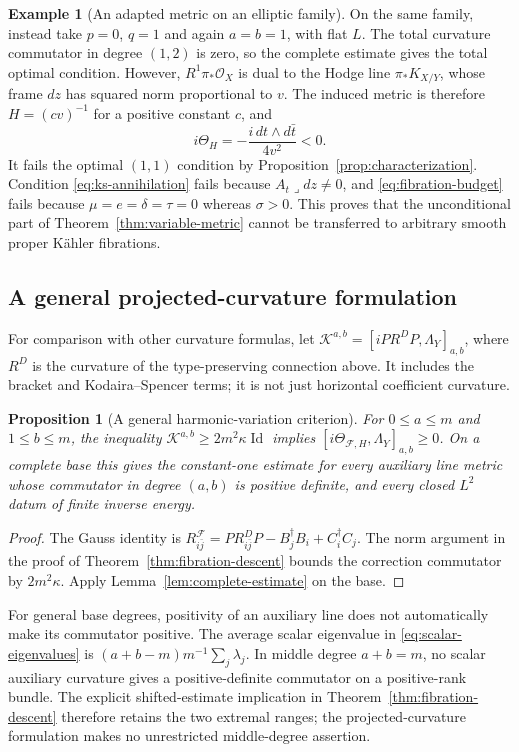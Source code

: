 \documentclass[11pt,reqno]{amsart}
\numberwithin{equation}{section}
\newtheorem{proposition}[theorem]{Proposition}
\theoremstyle{definition}
\newtheorem{example}[theorem]{Example}
\theoremstyle{remark}
\newcommand{\cF}{\mathcal F}
\newcommand{\Id}{\operatorname{Id}}
\newcommand{\cO}{\mathcal O}
\begin{document}
\begin{example}[An adapted metric on an elliptic family]
On the same family, instead take $p=0$, $q=1$ and again $a=b=1$, with flat $L$. The total curvature commutator in degree $(1,2)$ is zero, so the complete estimate gives the total optimal condition. However, $R^1\pi_*\cO_X$ is dual to the Hodge line $\pi_*K_{X/Y}$, whose frame $dz$ has squared norm proportional to $v$. The induced metric is therefore $H=(c v)^{-1}$ for a positive constant $c$, and
\[
             i\Theta_H=-\frac{i\,dt\wedge d\bar t}{4v^2}<0.
\]
It fails the optimal $(1,1)$ condition by Proposition~\ref{prop:characterization}. Condition \eqref{eq:ks-annihilation} fails because $A_t\lrcorner dz\ne0$, and \eqref{eq:fibration-budget} fails because $\mu=e=\delta=\tau=0$ whereas $\sigma>0$. This proves that the unconditional part of Theorem~\ref{thm:variable-metric} cannot be transferred to arbitrary smooth proper K\"ahler fibrations.
\end{example}

\subsection{A general projected-curvature formulation}
For comparison with other curvature formulas, let
$\mathcal K^{a,b}=[iPR^DP,\Lambda_Y]_{a,b}$, where $R^D$ is the curvature of the type-preserving connection above. It includes the bracket and Kodaira--Spencer terms; it is not just horizontal coefficient curvature.
\begin{proposition}[A general harmonic-variation criterion]\label{prop:variation}
For $0\leq a\leq m$ and $1\leq b\leq m$, the inequality
$\mathcal K^{a,b}\geq2m^2\kappa\Id$ implies
$[i\Theta_{\cF,H},\Lambda_Y]_{a,b}\geq0$.
On a complete base this gives the constant-one estimate for every auxiliary line metric whose commutator in degree $(a,b)$ is positive definite, and every closed $L^2$ datum of finite inverse energy.
\end{proposition}
\begin{proof}
The Gauss identity is $R^{\cF}_{i\bar j}=PR^D_{i\bar j}P-B_j^\dagger B_i+C_i^\dagger C_j$. The norm argument in the proof of Theorem~\ref{thm:fibration-descent} bounds the correction commutator by $2m^2\kappa$. Apply Lemma~\ref{lem:complete-estimate} on the base.
\end{proof}
For general base degrees, positivity of an auxiliary line does not automatically make its commutator positive. The average scalar eigenvalue in \eqref{eq:scalar-eigenvalues} is $(a+b-m)m^{-1}\sum_j\lambda_j$. In middle degree $a+b=m$, no scalar auxiliary curvature gives a positive-definite commutator on a positive-rank bundle. The explicit shifted-estimate implication in Theorem~\ref{thm:fibration-descent} therefore retains the two extremal ranges; the projected-curvature formulation makes no unrestricted middle-degree assertion.
\end{document}
